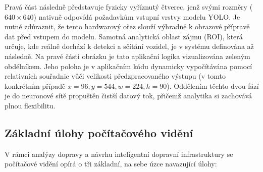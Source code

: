 \documentclass[male,czech,api_bc]{kitheses}
\begin{document}
Pravá část následně představuje fyzicky vyříznutý čtverec, jenž svými rozměry ($640\times640$) nativně odpovídá požadavkům vstupní vrstvy modelu YOLO. Je nutné zdůraznit, že tento hardwarový ořez slouží výhradně k obrazové přípravě dat před vstupem do modelu. Samotná analytická oblast zájmu (\acs{ROI}), která určuje, kde reálně dochází k detekci a sčítání vozidel, je v systému definována až následně. Na pravé části obrázku je tato aplikační logika vizualizována zeleným obdélníkem. Jeho poloha je v aplikačním kódu dynamicky vypočítávána pomocí relativních souřadnic vůči velikosti předzpracovaného výstupu (v tomto konkrétním případě $x=96, y=544, w=224, h=90$). Oddělením těchto dvou fází je do neuronové sítě propuštěn čistší datový tok, přičemž analytika si zachovává plnou flexibilitu.




\subsection{Základní úlohy počítačového vidění}
V rámci analýzy dopravy a návrhu inteligentní dopravní infrastruktury se počítačové vidění opírá o tři základní, na sebe úzce navazující úlohy:
\end{document}
